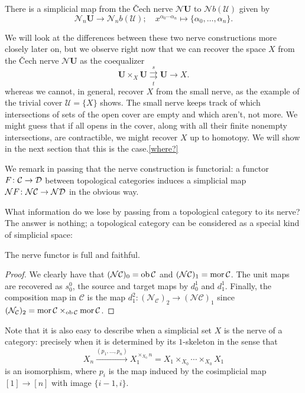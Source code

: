 \documentclass[a4paper,openany]{scrbook}
\renewcommand{\C}{\mathcal C}
\newcommand{\nerve}{\mathcal N}
\begin{document}
There is a simplicial map from the \v Cech nerve $\nerve\mathbf U$ to $\nerve b(\mathcal U)$ given by
\[
\nerve_n\mathbf U \to \nerve_nb(\mathcal U); \quad x^{\alpha_0\cdots\alpha_n} \mapsto \{\alpha_0,\dots,\alpha_n\}.
\]

We will look at the differences between these two nerve constructions more closely later on, but we observe right now that we can recover the space $X$ from the \v Cech nerve $\nerve\mathbf U$ as the coequalizer
\[
\mathbf U \times_X \mathbf U \overset{s}{\underset{t}{\rightrightarrows}} \mathbf U \to X.
\]
whereas we cannot, in general, recover $X$ from the small nerve, as the example of the trivial cover $\mathcal U = \{X\}$ shows. The small nerve keeps track of which intersections of sets of the open cover are empty and which aren't, not more. We might guess that if all opens in the cover, along with all their finite nonempty intersections, are contractible, we might recover $X$ up to homotopy. We will show in the next section that this is the case.\ref{where?}

We remark in passing that the nerve construction is functorial: a functor $F\colon \C \to \D$ between topological categories induces a simplicial map $\nerve F\colon \nerve\C \to \nerve\D$ in the obvious way. 

What information do we lose by passing from a topological category to its nerve? The answer is nothing; a topological category can be considered as a special kind of simplicial space:

\begin{prop}\label{prop:nervefullyfaithful}
The nerve functor is full and faithful. 
\end{prop}
\begin{proof}
We clearly have that $(\nerve\C)_0 = \ob\C$ and $(\nerve\C)_1 = \mor\C$. The unit maps are recovered as $s^0_0$, the source and target maps by $d^1_0$ and $d^1_1$. Finally, the composition map in $\C$ is the map $d^2_1\colon (\nerve_\C)_2 \to (\nerve\C)_1$ since $(\nerve_\C)_2 = \mor\C \times_{\ob\C} \mor\C$.
\end{proof}

Note that it is also easy to describe when a simplicial set $X$ is the nerve of a category: precisely when it is determined by its $1$-skeleton in the sense that
\[
X_n \xrightarrow{(p_1,\dots,p_n)} X_1^{\times_{X_0} n} = X_1 \times_{X_0} \cdots \times_{X_0} X_1
\]
is an isomorphism, where $p_i$ is the map induced by the cosimplicial map $[1] \to [n]$ with image $\{i-1,i\}$.
\end{document}
